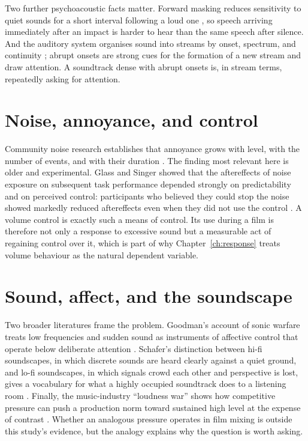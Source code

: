 Two further psychoacoustic facts matter. Forward masking reduces sensitivity to quiet sounds for a short interval following a loud one \citep{moore2012}, so speech arriving immediately after an impact is harder to hear than the same speech after silence. And the auditory system organises sound into streams by onset, spectrum, and continuity \citep{bregman1990}; abrupt onsets are strong cues for the formation of a new stream and draw attention. A soundtrack dense with abrupt onsets is, in stream terms, repeatedly asking for attention.

\section{Noise, annoyance, and control}

Community noise research establishes that annoyance grows with level, with the number of events, and with their duration \citep{kryter1985,miedema2001}. The finding most relevant here is older and experimental. Glass and Singer showed that the aftereffects of noise exposure on subsequent task performance depended strongly on predictability and on perceived control: participants who believed they could stop the noise showed markedly reduced aftereffects even when they did not use the control \citep{glass1972}. A volume control is exactly such a means of control. Its use during a film is therefore not only a response to excessive sound but a measurable act of regaining control over it, which is part of why Chapter~\ref{ch:response} treats volume behaviour as the natural dependent variable.

\section{Sound, affect, and the soundscape}

Two broader literatures frame the problem. Goodman's account of sonic warfare treats low frequencies and sudden sound as instruments of affective control that operate below deliberate attention \citep{goodman2010}. Schafer's distinction between hi-fi soundscapes, in which discrete sounds are heard clearly against a quiet ground, and lo-fi soundscapes, in which signals crowd each other and perspective is lost, gives a vocabulary for what a highly occupied soundtrack does to a listening room \citep{schafer1977}. Finally, the music-industry ``loudness war'' shows how competitive pressure can push a production norm toward sustained high level at the expense of contrast \citep{vickers2010}. Whether an analogous pressure operates in film mixing is outside this study's evidence, but the analogy explains why the question is worth asking.

